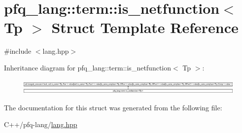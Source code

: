 \hypertarget{structpfq__lang_1_1term_1_1is__netfunction}{\section{pfq\+\_\+lang\+:\+:term\+:\+:is\+\_\+netfunction$<$ Tp $>$ Struct Template Reference}
\label{structpfq__lang_1_1term_1_1is__netfunction}
}


{\ttfamily \#include $<$lang.\+hpp$>$}

Inheritance diagram for pfq\+\_\+lang\+:\+:term\+:\+:is\+\_\+netfunction$<$ Tp $>$\+:\begin{figure}[H]
\begin{center}
\leavevmode
\includegraphics[height=0.775087cm]{structpfq__lang_1_1term_1_1is__netfunction}
\end{center}
\end{figure}


The documentation for this struct was generated from the following file\+:\begin{DoxyCompactItemize}
\item 
C++/pfq-\/lang/\hyperlink{lang_8hpp}{lang.\+hpp}\end{DoxyCompactItemize}
